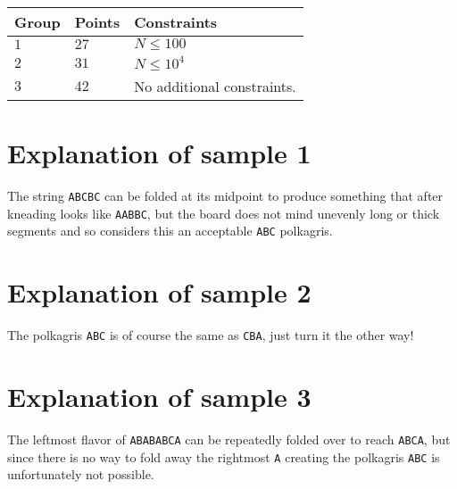 \noindent
\begin{tabular}{| l | l | p{12cm} |}
  \hline
  \textbf{Group} & \textbf{Points} & \textbf{Constraints} \\ \hline
  $1$    & $27$       & $N \leq 100$ \\ \hline
  $2$    & $31$       & $N \leq 10^4$ \\ \hline
  $3$    & $42$       & No additional constraints. \\ \hline
\end{tabular}

\section*{Explanation of sample 1}

The string \verb|ABCBC| can be folded at its midpoint to produce something that after kneading looks
like \verb|AABBC|, but the board does not mind unevenly long or thick segments and so considers this
an acceptable \verb|ABC| polkagris.

\section*{Explanation of sample 2}

The polkagris \verb|ABC| is of course the same as \verb|CBA|, just turn it the other way!

\section*{Explanation of sample 3}

The leftmost flavor of \verb|ABABABCA| can be repeatedly folded over to reach \verb|ABCA|, but since
there is no way to fold away the rightmost \verb|A| creating the polkagris \verb|ABC| is
unfortunately not possible.
